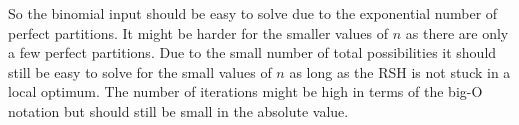 
So the binomial input should be easy to solve due to the exponential number of perfect partitions.
It might be harder for the smaller values of $n$ as there are only a few perfect partitions.
Due to the small number of total possibilities it should still be easy to solve for the small values of $n$ as long as the RSH is not stuck in a local optimum.
The number of iterations might be high in terms of the big-O notation but should still be small in the absolute value.

% 







% 
% 


